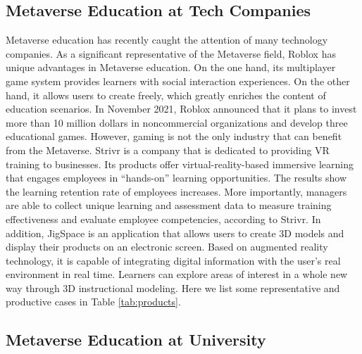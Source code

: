 \documentclass[conference]{IEEEtran}
\begin{document}
\subsection{Metaverse Education at Tech Companies}

Metaverse education has recently caught the attention of many technology companies. As a significant representative of the Metaverse field, Roblox has unique advantages in Metaverse education. On the one hand, its multiplayer game system provides learners with social interaction experiences. On the other hand, it allows users to create freely, which greatly enriches the content of education scenarios. In November 2021, Roblox announced that it plans to invest more than 10 million dollars in noncommercial organizations and develop three educational games. However, gaming is not the only industry that can benefit from the Metaverse. Strivr is a company that is dedicated to providing VR training to businesses. Its products offer virtual-reality-based immersive learning that engages employees in ``hands-on'' learning opportunities. The results show the learning retention rate of employees increases. More importantly, managers are able to collect unique learning and assessment data to measure training effectiveness and evaluate employee competencies, according to Strivr. In addition, JigSpace is an application that allows users to create 3D models and display their products on an electronic screen. Based on augmented reality technology, it is capable of integrating digital information with the user's real environment in real time. Learners can explore areas of interest in a whole new way through 3D instructional modeling. Here we list some representative and productive cases in Table \ref{tab:products}.


\subsection{Metaverse Education at University}
\end{document}
